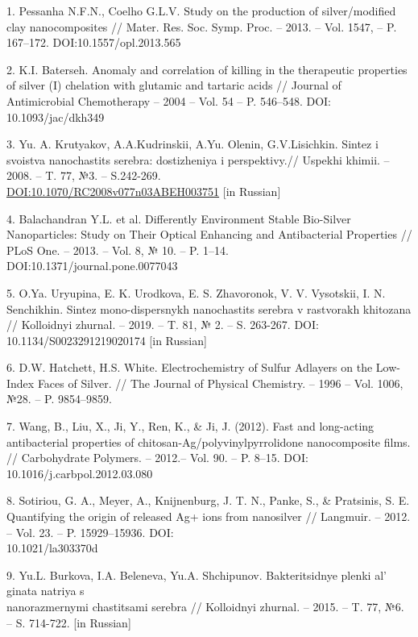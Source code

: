\begin{references}
1. Pessanha N.F.N., Coelho G.L.V. Study on the production of
silver/modified clay nanocomposites // Mater. Res. Soc. Symp. Proc. --
2013. -- Vol. 1547, -- P. 167--172. DOI:10.1557/opl.2013.565

2. K.I. Baterseh. Anomaly and correlation of killing in the therapeutic
properties of silver (I) chelation with glutamic and tartaric acids //
Journal of Antimicrobial Chemotherapy -- 2004 -- Vol. 54 -- P.
546--548. DOI: 10.1093/jac/dkh349

3. Yu. A. Krutyakov, A.A.Kudrinskii, A.Yu. Olenin, G.V.Lisichkin. Sintez
i svoistva nanochastits serebra: dostizheniya i perspektivy.// Uspekhi
khimii. -- 2008. -- T. 77, №3. -- S.242-269.
\\\href{https://doi.org/10.1070/RC2008v077n03ABEH003751}{DOI:10.1070/RC2008v077n03ABEH003751}
{[}in Russian{]}

4. Balachandran Y.L. et al. Differently Environment Stable Bio-Silver
Nanoparticles: Study on Their Optical Enhancing and Antibacterial
Properties // PLoS One. -- 2013. -- Vol. 8, № 10. -- P. 1--14.
\\DOI:10.1371/journal.pone.0077043

5. O.Ya. Uryupina, E. K. Urodkova, E. S. Zhavoronok, V. V. Vysotskii, I.
N. Senchikhin. Sintez mono-dispersnykh nanochastits serebra v
rastvorakh khitozana // Kolloidnyi zhurnal. -- 2019. -- T. 81, № 2. --
S. 263-267. DOI: 10.1134/S0023291219020174 {[}in Russian{]}

6. D.W. Hatchett, H.S. White. Electrochemistry of Sulfur Adlayers on the
Low-Index Faces of Silver. // The Journal of Physical Chemistry. --
1996 -- Vol. 1006, №28. -- P. 9854--9859.

7. Wang, B., Liu, X., Ji, Y., Ren, K., \& Ji, J. (2012). Fast and
long-acting antibacterial properties of
chitosan-Ag/polyvinylpyrrolidone nanocomposite films. // Carbohydrate
Polymers. -- 2012.-- Vol. 90. -- P. 8--15. DOI:
10.1016/j.carbpol.2012.03.080

8. Sotiriou, G. A., Meyer, A., Knijnenburg, J. T. N., Panke, S., \&
Pratsinis, S. E. Quantifying the origin of released Ag+ ions from
nanosilver // Langmuir. -- 2012. -- Vol. 23. -- P. 15929--15936. DOI:
\\10.1021/la303370d

9. Yu.L. Burkova, I.A. Beleneva, Yu.A. Shchipunov. Bakteritsidnye plenki
al' ginata natriya s \\nanorazmernymi chastitsami serebra
// Kolloidnyi zhurnal. -- 2015. -- T. 77, №6. -- S. 714-722. {[}in
Russian{]}


\end{references}
